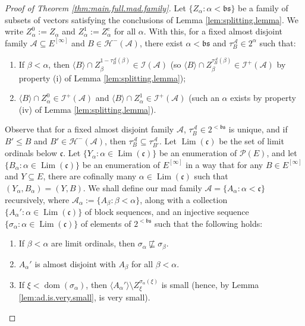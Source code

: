 \documentclass[10pt,a4paper]{amsart}
\theoremstyle{plain}
\numberwithin{equation}{section}
\theoremstyle{definition}
\newcommand{\func}{\operatorname}
\renewcommand{\c}[1]{\langle #1 \rangle}
\newcommand{\Po}{\cal{P}}
\newcommand{\cal}{\mathcal}
\renewcommand{\frak}{\mathfrak}
\newcommand{\dom}{\func{dom}}
\newcommand{\A}{\cal{A}}
\renewcommand{\H}{\cal{H}}
\newcommand{\I}{\cal{I}}
\newcommand{\Lim}{\func{Lim}}
\begin{document}
\begin{proof}[Proof of Theorem \ref{thm:main.full.mad.family}]
    Let $\{Z_\alpha : \alpha < \frak{bs}\}$ be a family of subsets of vectors satisfying the conclusions of Lemma \ref{lem:splitting.lemma}. We write $Z_\alpha^0 := Z_\alpha$ and $Z_\alpha^1 := Z_\alpha^c$ for all $\alpha$. With this, for a fixed almost disjoint family $\A \subseteq E^{[\infty]}$ and $B \in \H^-(\A)$, there exist $\alpha < \frak{bs}$ and $\tau_B^\A \in 2^\alpha$ such that:
    \begin{enumerate}
        \item If $\beta < \alpha$, then $\c{B} \cap Z_\beta^{1-\tau_B^\A(\beta)} \in \I(\A)$ (so $\c{B} \cap Z_\beta^{\tau_B^\A(\beta)} \in \I^+(\A)$ by property (i) of Lemma \ref{lem:splitting.lemma});

        \item $\c{B} \cap Z_\alpha^0 \in \I^+(\A)$ and $\c{B} \cap Z_\alpha^1 \in \I^+(\A)$ (such an $\alpha$ exists by property (iv) of Lemma \ref{lem:splitting.lemma}). 
    \end{enumerate}
    Observe that for a fixed almost disjoint family $\A$, $\tau_B^\A \in 2^{<\frak{bs}}$ is unique, and if $B' \leq B$ and $B' \in \H^-(\A)$, then $\tau_B^\A \subseteq \tau_{B'}^\A$. Let $\Lim(\frak{c})$ be the set of limit ordinals below $\frak{c}$. Let $\{Y_\alpha : \alpha \in \Lim(\frak{c})\}$ be an enumeration of $\Po(E)$, and let $\{B_\alpha : \alpha \in \Lim(\frak{c})\}$ be an enumeration of $E^{[\infty]}$ in a way that for any $B \in E^{[\infty]}$ and $Y \subseteq E$, there are cofinally many $\alpha \in \Lim(\frak{c})$ such that $(Y_\alpha,B_\alpha) = (Y,B)$. We shall define our mad family $\A = \{A_\alpha : \alpha < \frak{c}\}$ recursively, where $\A_\alpha := \{A_\beta : \beta < \alpha\}$, along with a collection $\{A_\alpha' : \alpha \in \Lim(\frak{c})\}$ of block sequences, and an injective sequence $\{\sigma_\alpha : \alpha \in \Lim(\frak{c})\}$ of elements of $2^{<\frak{bs}}$ such that the following holds:
    \begin{enumerate}
        \item If $\beta < \alpha$ are limit ordinals, then $\sigma_\alpha \not\sqsubseteq \sigma_\beta$.

        \item $A_\alpha'$ is almost disjoint with $A_\beta$ for all $\beta < \alpha$.

        \item If $\xi < \dom(\sigma_\alpha)$, then $\c{A_\alpha'} \setminus Z_\xi^{\sigma_\alpha(\xi)}$ is small (hence, by Lemma \ref{lem:ad.is.very.small}, is very small).


\end{enumerate}
\end{proof}
\end{document}
